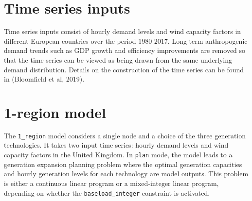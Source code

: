 \documentclass[preprint]{elsarticle}
\begin{document}
\section{Time series inputs}

Time series inputs consist of hourly demand levels and wind capacity factors in different European countries over the period 1980-2017. Long-term anthropogenic demand trends such as GDP growth and efficiency improvements are removed so that the time series can be viewed as being drawn from the same underlying demand distribution. Details on the construction of the time series can be found in (Bloomfield et al, 2019).




\section{1-region model}

\noindent The \texttt{1\_region} model considers a single node and a choice of the three generation technologies. It takes two input time series: hourly demand levels and wind capacity factors in the United Kingdom. In \texttt{plan} mode, the model leads to a generation expansion planning problem where the optimal generation capacities and hourly generation levels for each technology are model outputs. This problem is either a continuous linear program or a mixed-integer linear program, depending on whether the \texttt{baseload\_integer} constraint is activated.
\end{document}

